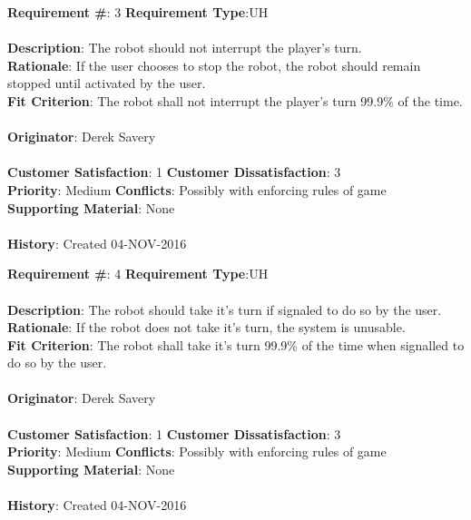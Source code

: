 \documentclass[titlepage]{article}
\begin{document}
\begin{framed}
	\noindent\textbf{Requirement \#}: 3 \hfill \textbf{Requirement Type}:UH \hfill\\\\
	\noindent\textbf{Description}: The robot should not interrupt the player's turn.\\
	\textbf{Rationale}: If the user chooses to stop the robot, the robot should remain stopped until activated by the user.\\
	\textbf{Fit Criterion}: The robot shall not interrupt the player's turn 99.9\% of the time.\\\\
	\textbf{Originator}: Derek Savery\\\\
	\noindent\textbf{Customer Satisfaction}: 1 \hfill 	\textbf{Customer Dissatisfaction}: 3 \hfill\\
	\textbf{Priority}: Medium \hfill \textbf{Conflicts}: Possibly with enforcing rules of game \hfill\\
	\textbf{Supporting Material}: None\\\\
	\noindent\textbf{History}: Created 04-NOV-2016
\end{framed}

\begin{framed}
	\noindent\textbf{Requirement \#}: 4 \hfill \textbf{Requirement Type}:UH \hfill\\\\
	\noindent\textbf{Description}: The robot should take it's turn if signaled to do so by the user.\\
	\textbf{Rationale}: If the robot does not take it's turn, the system is unusable.\\
	\textbf{Fit Criterion}: The robot shall take it's turn 99.9\% of the time when signalled to do so by the user.\\\\
	\textbf{Originator}: Derek Savery\\\\
	\noindent\textbf{Customer Satisfaction}: 1 \hfill 	\textbf{Customer Dissatisfaction}: 3 \hfill\\
	\textbf{Priority}: Medium \hfill \textbf{Conflicts}: Possibly with enforcing rules of game \hfill\\
	\textbf{Supporting Material}: None\\\\
	\noindent\textbf{History}: Created 04-NOV-2016
\end{framed}
\end{document}
